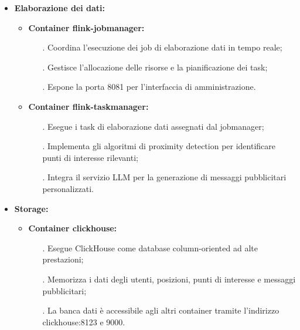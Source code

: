 \documentclass[10pt]{article}
\begin{document}
\begin{itemize}
    \item \textbf{Elaborazione dei dati:}
    \begin{itemize}
        \item \textbf{Container flink-jobmanager:}
        \begin{itemize}
            \item[.] Coordina l'esecuzione dei job di elaborazione dati in tempo reale;
            \item[.] Gestisce l'allocazione delle risorse e la pianificazione dei task;
            \item[.] Espone la porta 8081 per l'interfaccia di amministrazione.
        \end{itemize}
        \item \textbf{Container flink-taskmanager:}
        \begin{itemize}
            \item[.] Esegue i task di elaborazione dati assegnati dal jobmanager;
            \item[.] Implementa gli algoritmi di proximity detection per identificare punti di interesse rilevanti;
            \item[.] Integra il servizio LLM per la generazione di messaggi pubblicitari personalizzati.
        \end{itemize}
    \end{itemize}

    \item \textbf{Storage:}
    \begin{itemize}
        \item \textbf{Container clickhouse:}
        \begin{itemize}
            \item[.] Esegue ClickHouse come database column-oriented ad alte prestazioni;
            \item[.] Memorizza i dati degli utenti, posizioni, punti di interesse e messaggi pubblicitari;
            \item[.] La banca dati è accessibile agli altri container tramite l'indirizzo clickhouse:8123 e 9000.
        \end{itemize}
    \end{itemize}


\end{itemize}
\end{document}
